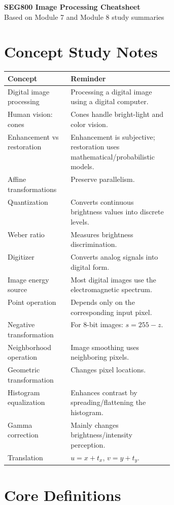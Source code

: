 \documentclass[8pt]{extarticle}
\begin{document}
\begin{center}
    {\Large \textbf{SEG800 Image Processing Cheatsheet}}\\[-1pt]
    {\small Based on Module 7 and Module 8 study summaries}
\end{center}

\begin{multicols}{2}

\section{Concept Study Notes}

\begin{tabularx}{\linewidth}{@{}p{0.38\linewidth}Y@{}}
\toprule
\textbf{Concept} & \textbf{Reminder} \\
\midrule
Digital image processing & Processing a digital image using a digital computer. \\
Human vision: cones & Cones handle bright-light and color vision. \\
Enhancement vs restoration & Enhancement is subjective; restoration uses mathematical/probabilistic models. \\
Affine transformations & Preserve parallelism. \\
Quantization & Converts continuous brightness values into discrete levels. \\
Weber ratio & Measures brightness discrimination. \\
Digitizer & Converts analog signals into digital form. \\
Image energy source & Most digital images use the electromagnetic spectrum. \\
Point operation & Depends only on the corresponding input pixel. \\
Negative transformation & For 8-bit images: $s = 255 - z$. \\
Neighborhood operation & Image smoothing uses neighboring pixels. \\
Geometric transformation & Changes pixel locations. \\
Histogram equalization & Enhances contrast by spreading/flattening the histogram. \\
Gamma correction & Mainly changes brightness/intensity perception. \\
Translation & $u = x + t_x$, $v = y + t_y$. \\
\bottomrule
\end{tabularx}

\section{Core Definitions}


\end{multicols}
\end{document}
